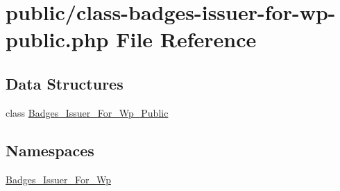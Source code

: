 \hypertarget{class-badges-issuer-for-wp-public_8php}{}\section{public/class-\/badges-\/issuer-\/for-\/wp-\/public.php File Reference}
\label{class-badges-issuer-for-wp-public_8php}
\subsection*{Data Structures}
\begin{DoxyCompactItemize}
\item 
class \hyperlink{class_badges___issuer___for___wp___public}{Badges\+\_\+\+Issuer\+\_\+\+For\+\_\+\+Wp\+\_\+\+Public}
\end{DoxyCompactItemize}
\subsection*{Namespaces}
\begin{DoxyCompactItemize}
\item 
 \hyperlink{namespace_badges___issuer___for___wp}{Badges\+\_\+\+Issuer\+\_\+\+For\+\_\+\+Wp}
\end{DoxyCompactItemize}
